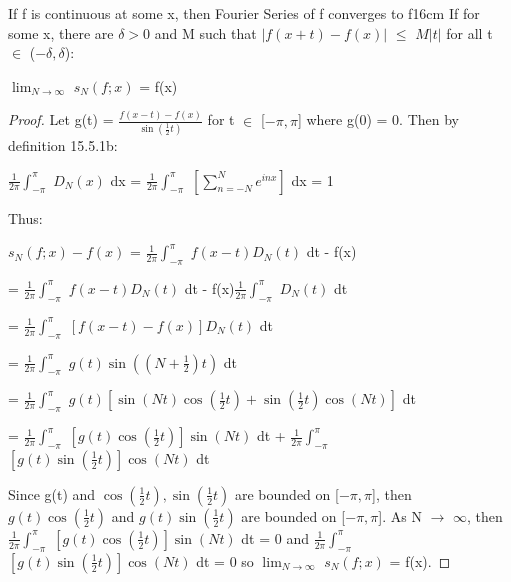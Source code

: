     \vspace{0.5cm}



    \begin{wtheorem}
    {If f is continuous at some x, then Fourier Series of f converges to f}{16cm}
        If for some x, there are $\delta > 0$ and M such that
        $|f(x+t) - f(x)|$ $\leq$ $M|t|$
        for all t $\in$ ($-\delta,\delta$):

        \hspace{0.5cm}
        $\lim_{N \rightarrow \infty}$ $s_N(f;x)$ = f(x)
    \end{wtheorem}

    \begin{proof}
        Let g(t) = $\frac{f(x-t) - f(x)}{\sin(\frac{1}{2}t)}$ for
        t $\in$ [$-\pi,\pi$] where g(0) = 0.
        Then by {\color{blue} definition 15.5.1b}:

        \hspace{0.5cm}
        $\frac{1}{2\pi} \int_{-\pi}^{\pi}$ $D_N(x)$ dx
        = $\frac{1}{2\pi} \int_{-\pi}^{\pi}$ $[\sum_{n=-N}^N e^{inx}]$ dx
        = 1

        Thus:

        \hspace{0.5cm}
        $s_N(f;x) - f(x)$
        = $\frac{1}{2\pi} \int_{-\pi}^{\pi}$ $f(x-t) D_N(t)$ dt - f(x)

        \hspace{3.2cm}
        = $\frac{1}{2\pi} \int_{-\pi}^{\pi}$ $f(x-t) D_N(t)$ dt
            - f(x)$\frac{1}{2\pi} \int_{-\pi}^{\pi}$ $D_N(t)$ dt

        \hspace{3.2cm}
        = $\frac{1}{2\pi} \int_{-\pi}^{\pi}$ $[f(x-t)-f(x)] D_N(t)$ dt

        \hspace{3.2cm}
        = $\frac{1}{2\pi} \int_{-\pi}^{\pi}$ $g(t) \sin((N+\frac{1}{2})t)$ dt

        \hspace{3.2cm}
        = $\frac{1}{2\pi} \int_{-\pi}^{\pi}$
            $g(t) [\sin(Nt)\cos(\frac{1}{2}t) + \sin(\frac{1}{2}t)\cos(Nt)]$ dt

        \hspace{3.2cm}
        = $\frac{1}{2\pi} \int_{-\pi}^{\pi}$ $[g(t)\cos(\frac{1}{2}t)]\sin(Nt)$ dt
        + $\frac{1}{2\pi} \int_{-\pi}^{\pi}$ $[g(t)\sin(\frac{1}{2}t)]\cos(Nt)$ dt

        Since g(t) and $\cos(\frac{1}{2}t),\sin(\frac{1}{2}t)$ are bounded on
        [$-\pi,\pi$], then $g(t)\cos(\frac{1}{2}t)$ and $g(t)\sin(\frac{1}{2}t)$
        are bounded on [$-\pi,\pi$].
        As N $\rightarrow$ $\infty$, then
        $\frac{1}{2\pi} \int_{-\pi}^{\pi}$
        $[g(t)\cos(\frac{1}{2}t)]\sin(Nt)$ dt = 0
        and
        $\frac{1}{2\pi} \int_{-\pi}^{\pi}$
        $[g(t)\sin(\frac{1}{2}t)]\cos(Nt)$ dt = 0
        so $\lim_{N \rightarrow \infty}$ $s_N(f;x)$ = f(x).
    \end{proof}

